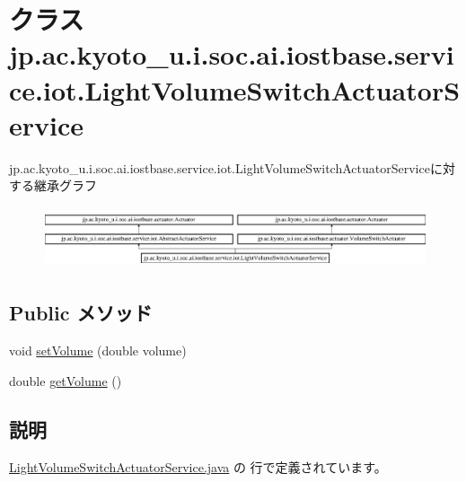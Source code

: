 \hypertarget{classjp_1_1ac_1_1kyoto__u_1_1i_1_1soc_1_1ai_1_1iostbase_1_1service_1_1iot_1_1_light_volume_switch_actuator_service}{\section{クラス jp.\-ac.\-kyoto\-\_\-u.\-i.\-soc.\-ai.\-iostbase.\-service.\-iot.\-Light\-Volume\-Switch\-Actuator\-Service}
\label{classjp_1_1ac_1_1kyoto__u_1_1i_1_1soc_1_1ai_1_1iostbase_1_1service_1_1iot_1_1_light_volume_switch_actuator_service}
}
jp.\-ac.\-kyoto\-\_\-u.\-i.\-soc.\-ai.\-iostbase.\-service.\-iot.\-Light\-Volume\-Switch\-Actuator\-Serviceに対する継承グラフ\begin{figure}[H]
\begin{center}
\leavevmode
\includegraphics[height=1.842105cm]{classjp_1_1ac_1_1kyoto__u_1_1i_1_1soc_1_1ai_1_1iostbase_1_1service_1_1iot_1_1_light_volume_switch_actuator_service}
\end{center}
\end{figure}
\subsection*{Public メソッド}
\begin{DoxyCompactItemize}
\item 
void \hyperlink{classjp_1_1ac_1_1kyoto__u_1_1i_1_1soc_1_1ai_1_1iostbase_1_1service_1_1iot_1_1_light_volume_switch_actuator_service_a20ff091e653e9ac9261413a244bed6a3}{set\-Volume} (double volume)
\item 
double \hyperlink{classjp_1_1ac_1_1kyoto__u_1_1i_1_1soc_1_1ai_1_1iostbase_1_1service_1_1iot_1_1_light_volume_switch_actuator_service_ae8644a4341f913f7c3a50feaca4350c9}{get\-Volume} ()
\end{DoxyCompactItemize}


\subsection{説明}


 \hyperlink{_light_volume_switch_actuator_service_8java_source}{Light\-Volume\-Switch\-Actuator\-Service.\-java} の  行で定義されています。



